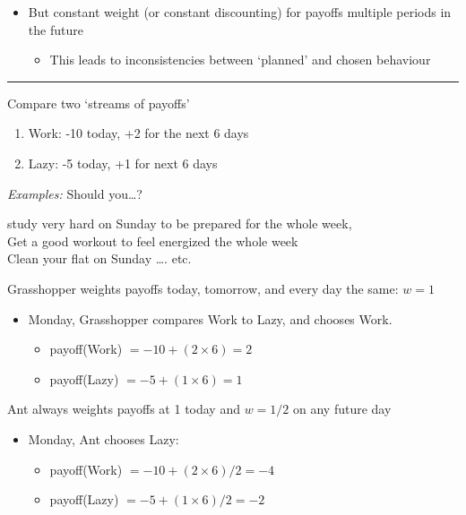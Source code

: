 \documentclass[]{article}
\providecommand{\tightlist}{%
  \setlength{\itemsep}{0pt}\setlength{\parskip}{0pt}}
\begin{document}
\bigskip

\begin{itemize}
\tightlist
\item
  But constant weight (or constant discounting) for payoffs multiple periods in the future

  \begin{itemize}
  \tightlist
  \item
    This leads to inconsistencies between `planned' and chosen behaviour
  \end{itemize}
\end{itemize}

\begin{center}\rule{0.5\linewidth}{\linethickness}\end{center}

Compare two `streams of payoffs'

\begin{enumerate}
\def\labelenumi{\arabic{enumi}.}
\item
  Work: -10 today, +2 for the next 6 days
\item
  Lazy: -5 today, +1 for next 6 days
\end{enumerate}

\emph{Examples:} Should you\ldots{}?

study very hard on Sunday to be prepared for the whole week,\\
Get a good workout to feel energized the whole week\\
Clean your flat on Sunday \ldots{}. etc.

\bigskip

Grasshopper weights payoffs today, tomorrow, and every day the same: \(w=1\)

\begin{itemize}
\tightlist
\item
  Monday, Grasshopper compares Work to Lazy, and chooses Work.

  \begin{itemize}
  \tightlist
  \item
    payoff(Work) \(= -10 + (2 \times 6) = 2\)
  \item
    payoff(Lazy) \(= -5 + (1 \times 6) = 1\)
  \end{itemize}
\end{itemize}

\bigskip

Ant always weights payoffs at 1 today and \(w=1/2\) on any future day

\begin{itemize}
\tightlist
\item
  Monday, Ant chooses Lazy:

  \begin{itemize}
  \tightlist
  \item
    payoff(Work) \(= -10 +(2 \times 6)/2 = -4\)
  \item
    payoff(Lazy) \(= -5 + (1 \times 6)/2 = -2\)
  \end{itemize}
\end{itemize}
\end{document}
